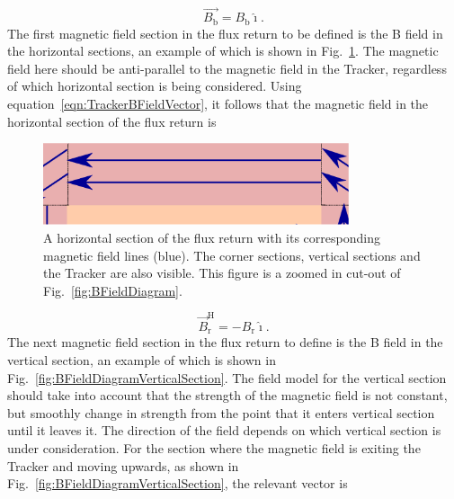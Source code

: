 \begin{equation}
  \overrightarrow{B_{\textrm{b}}} = {B_{\textrm{b}}}\hat{\imath}.
  \label{eqn:TrackerBFieldVector}
\end{equation}
The first magnetic field section in the flux return to be defined is the B field in the horizontal sections, an example of which is shown in Fig.~\ref{fig:BFieldDiagramHorizontalSection}.  The magnetic field here should be anti-parallel to the magnetic field in the Tracker, regardless of which horizontal section is being considered.  Using equation~\ref{eqn:TrackerBFieldVector}, it follows that the magnetic field in the horizontal section of the flux return is
\begin{figure}
  \centering
  \includegraphics[width=9cm]{images/magnetic_field/BFieldDiagramHorizontalSection}
  \caption{A horizontal section of the flux return with its corresponding magnetic field lines (blue).  The corner sections, vertical sections and the Tracker are also visible.  This figure is a zoomed in cut-out of Fig.~\ref{fig:BFieldDiagram}.}
  \label{fig:BFieldDiagramHorizontalSection}
\end{figure}
\begin{equation}
  \overrightarrow{B}^{\textrm{H}}_{\textrm{r}} = -{B_{\textrm{r}}}\hat{\imath}.
  \label{eqn:HorizontalReturnBFieldVector}
\end{equation}
The next magnetic field section in the flux return to define is the B field in the vertical section, an example of which is shown in Fig.~\ref{fig:BFieldDiagramVerticalSection}. The field model for the vertical section should take into account that the strength of the magnetic field is not constant, but smoothly change in strength from the point that it enters vertical section until it leaves it.  The direction of the field depends on which vertical section is under consideration.  For the section where the magnetic field is exiting the Tracker and moving upwards, as shown in Fig.~\ref{fig:BFieldDiagramVerticalSection}, the relevant vector is
